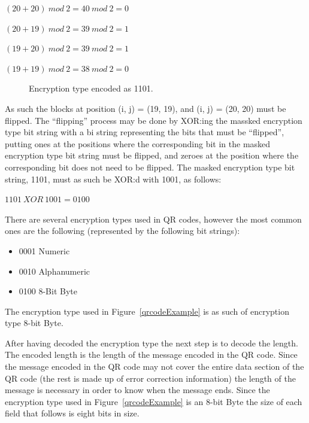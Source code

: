 \begin{center}

\((20+20)~mod~2=40~mod~2=0\)

\((20+19)~mod~2=39~mod~2=1\)

\((19+20)~mod~2=39~mod~2=1\)

\((19+19)~mod~2=38~mod~2=0\)

\end{center}

	\begin{figure}[H]%
		\centering
		\caption{Encryption type encoded as 1101.}
		\label{qrcodeExampleStep4}
	\end{figure}

As such the blocks at position (i, j) = (19, 19), and (i, j) = (20, 20) must be flipped. The ``flipping'' process may be done by XOR:ing the massked encryption type bit string with a bi string representing the bits that must be ``flipped'', putting ones at the positions where the corresponding bit in the masked encryption type bit string must be flipped, and zeroes at the position where the corresponding bit does not need to be flipped. The masked encryption type bit string, 1101, must as such be XOR:d with 1001, as follows:

\begin{center}
\(1101~XOR~1001=0100\)
\end{center}

There are several encryption types used in QR codes, however the most common ones are the following (represented by the following bit strings):

\begin{itemize}
	\item 0001 Numeric
	\item 0010 Alphanumeric
	\item 0100 8-Bit Byte
\end{itemize}

The encryption type used in Figure~\ref{qrcodeExample} is as such of encryption type 8-bit Byte.

After having decoded the encryption type the next step is to decode the length. The encoded length is the length of the message encoded in the QR code. Since the message encoded in the QR code may not cover the entire data section of the QR code (the rest is made up of error correction information) the length of the message is necessary in order to know when the message ends. Since the encryption type used in Figure~\ref{qrcodeExample} is an 8-bit Byte the size of each field that follows is eight bits in size.

